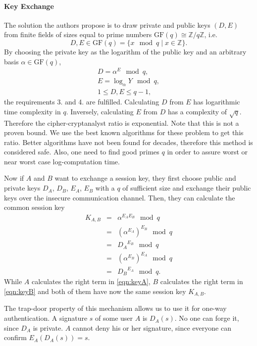 \documentclass[paper=a4, fontsize=11pt]{scrartcl} %
\numberwithin{equation}{section} %
\numberwithin{figure}{section} %
\numberwithin{table}{section} %
\begin{document}
\paragraph{Key Exchange}
The solution the authors propose is to draw private and public keys $(D,E)$ from finite fields of sizes equal to prime numbers $\mathrm{GF}(q)\cong\mathbb{Z}/q\mathbb{Z}$, i.e.
\begin{equation}
D, E \in \mathrm{GF}(q) = \{x \mod q \mid x \in \mathbb{Z}\}.
\end{equation}
By choosing the private key as the logarithm of the public key and an arbitrary basis $\alpha \in \mathrm{GF}(q)$,
\begin{eqnarray}
D = \alpha^E\mod q,\\
E = \log_\alpha Y \mod q,\\
1 \leq D,E \leq q-1,
\end{eqnarray}
the requirements 3. and 4. are fulfilled. Calculating $D$ from $E$ has logarithmic time complexity in $q$. Inversely, calculating $E$ from $D$ has a complexity of $\sqrt{q}$. Therefore the cipher-cryptanalyst ratio is exponential. Note that this is not a proven bound. We use the best known algorithms for these problem to get this ratio. Better algorithms have not been found for decades, therefore this method is considered safe. Also, one need to find good primes $q$ in order to assure worst or near worst case log-computation time.

Now if $A$ and $B$ want to exchange a session key, they first choose public and private keys $D_A$, $D_B$, $E_A$, $E_B$ with a $q$ of sufficient size and exchange their public keys over the insecure communication channel. Then, they can calculate the common session key
\begin{eqnarray}
K_{A,B} & = & \alpha^{E_AE_B} \mod q\\
& = & (\alpha^{E_A})^{E_B} \mod q\\
& = & {D_A}^{E_B} \mod q\label{eqn:keyA}\\
& = & (\alpha^{E_B})^{E_A} \mod q\\
& = & {D_B}^{E_A} \mod q.\label{eqn:keyB}
\end{eqnarray}
While $A$ calculates the right term in \ref{eqn:keyA}, $B$ calculates the right term in \ref{eqn:keyB} and both of them have now the same session key $K_{A,B}$.

The trap-door property of this mechanism allows us to use it for one-way authentication. A signature $s$ of some user $A$ is $D_A(s)$. No one can forge it, since $D_A$ is private. $A$ cannot deny his or her signature, since everyone can confirm $E_A(D_A(s)) = s$.
\end{document}
